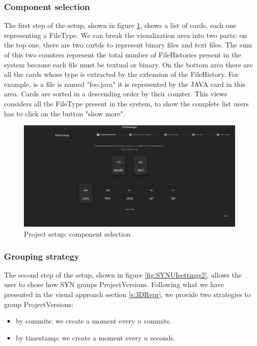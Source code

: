 \subsubsection*{Component selection}
The first step of the setup, shown in figure \ref{fig:SYNUIsettings1}, shows a list of cards, each one representing a FileType. 
We can break the visualization area into two parts: on the top one, there are two cartds to represent binary files and text files. 
The sum of this two counters represent the total number of FileHistories present in the system because each file must be textual or binary. 
On the bottom area there are all the cards whose type is extracted by the extension of the FileHistory. For example, is a file is named "foo.java" it is represented by the JAVA card in this area. 
Cards are sorted in a descending order by their counter. This views considers all the FileType present in the system, to show the complete list users has to click on the button "show more".

\begin{figure}
    \center
    \includegraphics[width=\textwidth]{SYNUI-settings1.png}
    \caption{Project setup: component selection}
    \label{fig:SYNUIsettings1}
\end{figure}


\subsubsection*{Grouping strategy}
The second step of the setup, shown in figure \ref{fig:SYNUIsettings2}, allows the user to chose how SYN groups ProjectVersions. 
Following what we have presented in the visual approach section \ref{s:3DRepr}, we provide two strategies to group ProjectVersions:
\begin{itemize}
    \item by commits: we create a moment every $n$ commits. 
    \item by timestamp: we create a moment every $n$ seconds. 
\end{itemize}

